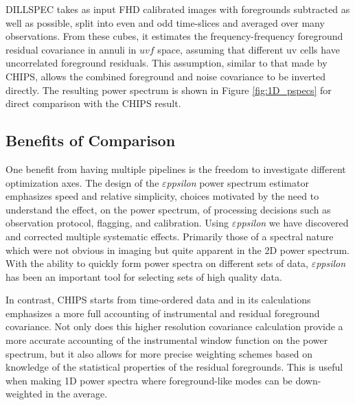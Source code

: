 \documentclass[preprint2]{aastex}
\def\eppsilon{{\it $\varepsilon$ppsilon}}
\def\empirical{DILLSPEC}
\begin{document}
\empirical{} takes as input FHD calibrated images with foregrounds subtracted as well as possible, split into even and odd time-slices and averaged over many observations. From these cubes, it estimates the frequency-frequency foreground residual covariance in annuli in $uvf$ space, assuming that different uv cells have uncorrelated foreground residuals. This assumption, similar to that made by CHIPS, allows the combined foreground and noise covariance to be inverted directly. The resulting power spectrum is shown in Figure \ref{fig:1D_pspecs} for direct comparison with the CHIPS result. 


\subsection{Benefits of Comparison}
\label{sec:benefits_of_comparison}


One benefit from having multiple pipelines is the freedom to investigate  different optimization axes.  The design of the \eppsilon{} power spectrum estimator emphasizes speed and relative simplicity, choices  motivated by the need to understand the effect, on the power spectrum, of processing decisions such as observation protocol, flagging, and calibration. Using \eppsilon{} we have discovered and corrected multiple systematic effects. Primarily those of a spectral nature which were not obvious in imaging but quite apparent in the 2D power spectrum. With the ability to quickly form power spectra on different sets of data, \eppsilon{} has been an important tool for selecting sets of high quality data. 

In contrast, CHIPS starts from time-ordered data and in its calculations emphasizes a more full accounting of instrumental and residual foreground covariance. Not only does this higher resolution covariance calculation provide a more accurate accounting of the instrumental window function on the power spectrum, but it also allows for more precise weighting schemes based on knowledge of the statistical properties of the residual foregrounds. This is useful when making 1D power spectra where foreground-like modes can be down-weighted in the average. 
\end{document}
